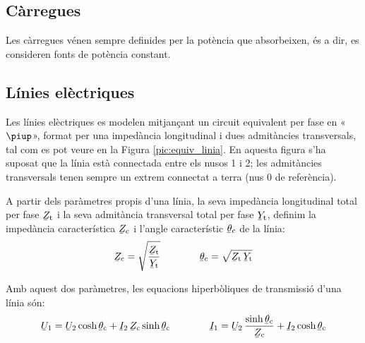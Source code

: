 \subsection{Càrregues}

Les càrregues vénen sempre definides per la potència que absorbeixen, és a dir, es consideren fonts de potència constant.

\subsection{Línies elèctriques} 

Les línies elèctriques es modelen mitjançant un circuit equivalent
per fase en «$\piup$», format per una impedància longitudinal i dues
admitàncies transversals, tal com es pot veure en la Figura
\vref{pic:equiv_linia}. En aquesta figura s'ha suposat que la línia
està connectada entre els nusos 1 i 2; les admitàncies transversals
tenen sempre un extrem connectat a terra (nus 0 de referència).

\begin{center}
    
    \label{pic:equiv_linia}
\end{center}

A partir dels paràmetres propis d'una línia, la seva impedància
longitudinal  total per fase $\cmplx{Z}\ped{t}$ i la seva admitància
transversal total per fase $\cmplx{Y}\ped{t}$, definim la impedància
característica $\cmplx{Z}\ped{c}$ i l'angle característic
$\cmplx{\theta}\ped{c}$ de la línia:   
\begin{equation}
   \cmplx{Z}\ped{c} = \sqrt{\frac{\cmplx{Z}\ped{t}}{\cmplx{Y}\ped{t}}} \qquad \qquad
   \cmplx{\theta}\ped{c} = \sqrt{\cmplx{Z}\ped{t} \,\cmplx{Y}\ped{t} }
\end{equation}

Amb aquest dos paràmetres, les equacions hiperbòliques de
transmissió d'una línia són: 
\begin{equation}\label{eq:linia_eq_trans}
   \cmplx{U}_1 = \cmplx{U}_2 \cosh \cmplx{\theta}\ped{c}  + \cmplx{I}_2 \,\cmplx{Z}\ped{c} \sinh \cmplx{\theta}\ped{c}   \qquad \qquad
   \cmplx{I}_1 = \cmplx{U}_2 \, \frac{\sinh \cmplx{\theta}\ped{c}}{\cmplx{Z}\ped{c}}  +   \cmplx{I}_2 \cosh \cmplx{\theta}\ped{c}
\end{equation}

